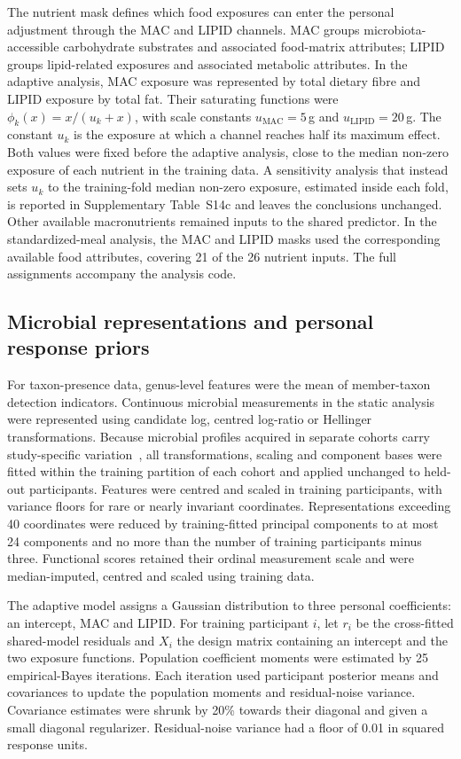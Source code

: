 \documentclass[pdflatex,sn-nature]{sn-jnl}
\theoremstyle{thmstyleone}
\theoremstyle{thmstyletwo}
\theoremstyle{thmstylethree}
\begin{document}
The nutrient mask defines which food exposures can enter the personal adjustment through the MAC and LIPID channels. MAC groups microbiota-accessible carbohydrate substrates and associated food-matrix attributes; LIPID groups lipid-related exposures and associated metabolic attributes. In the adaptive analysis, MAC exposure was represented by total dietary fibre and LIPID exposure by total fat. Their saturating functions were $\phi_k(x)=x/(u_k+x)$, with scale constants $u_{\mathrm{MAC}}=5$\,g and $u_{\mathrm{LIPID}}=20$\,g. The constant $u_k$ is the exposure at which a channel reaches half its maximum effect. Both values were fixed before the adaptive analysis, close to the median non-zero exposure of each nutrient in the training data. A sensitivity analysis that instead sets $u_k$ to the training-fold median non-zero exposure, estimated inside each fold, is reported in Supplementary Table~S14c and leaves the conclusions unchanged. Other available macronutrients remained inputs to the shared predictor. In the standardized-meal analysis, the MAC and LIPID masks used the corresponding available food attributes, covering 21 of the 26 nutrient inputs. The full assignments accompany the analysis code.

\subsection{Microbial representations and personal response priors}

For taxon-presence data, genus-level features were the mean of member-taxon detection indicators. Continuous microbial measurements in the static analysis were represented using candidate log, centred log-ratio or Hellinger transformations. Because microbial profiles acquired in separate cohorts carry study-specific variation~\cite{netmoss,falony,zhernakova}, all transformations, scaling and component bases were fitted within the training partition of each cohort and applied unchanged to held-out participants. Features were centred and scaled in training participants, with variance floors for rare or nearly invariant coordinates. Representations exceeding 40 coordinates were reduced by training-fitted principal components to at most 24 components and no more than the number of training participants minus three. Functional scores retained their ordinal measurement scale and were median-imputed, centred and scaled using training data.

The adaptive model assigns a Gaussian distribution to three personal coefficients: an intercept, MAC and LIPID. For training participant $i$, let $r_i$ be the cross-fitted shared-model residuals and $X_i$ the design matrix containing an intercept and the two exposure functions. Population coefficient moments were estimated by 25 empirical-Bayes iterations. Each iteration used participant posterior means and covariances to update the population moments and residual-noise variance. Covariance estimates were shrunk by 20\% towards their diagonal and given a small diagonal regularizer. Residual-noise variance had a floor of 0.01 in squared response units.
\end{document}
